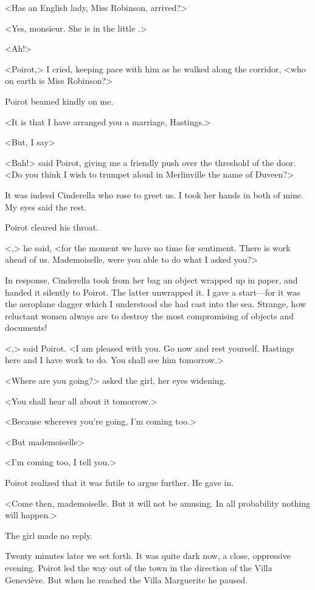  <Has an English lady, Miss Robinson, arrived?> 

 <Yes, monsieur. She is in the little .> 

 <Ah!> 

 <Poirot,> I cried, keeping pace with him as he walked along the corridor, <who on earth is Miss Robinson?> 

 Poirot beamed kindly on me. 

 <It is that I have arranged you a marriage, Hastings.> 

 <But, I say\longdash> 

 <Bah!> said Poirot, giving me a friendly push over the threshold of the door. <Do you think I wish to trumpet aloud in Merlinville the name of Duveen?> 

 It was indeed Cinderella who rose to greet us. I took her hands in both of mine. My eyes said the rest. 

 Poirot cleared his throat. 

 <,> he said, <for the moment we have no time for sentiment. There is work ahead of us. Mademoiselle, were you able to do what I asked you?> 

 In response, Cinderella took from her bag an object wrapped up in paper, and handed it silently to Poirot. The latter unwrapped it. I gave a start—for it was the aeroplane dagger which I understood she had cast into the sea. Strange, how reluctant women always are to destroy the most compromising of objects and documents! 

 <,> said Poirot. <I am pleased with you. Go now and rest yourself. Hastings here and I have work to do. You shall see him tomorrow.> 

 <Where are you going?> asked the girl, her eyes widening. 

 <You shall hear all about it tomorrow.> 

 <Because wherever you're going, I'm coming too.> 

 <But mademoiselle\longdash> 

 <I'm coming too, I tell you.> 

 Poirot realized that it was futile to argue further. He gave in. 

 <Come then, mademoiselle. But it will not be amusing. In all probability nothing will happen.> 

 The girl made no reply. 

 Twenty minutes later we set forth. It was quite dark now, a close, oppressive evening. Poirot led the way out of the town in the direction of the Villa Geneviève. But when he reached the Villa Marguerite he paused. 

